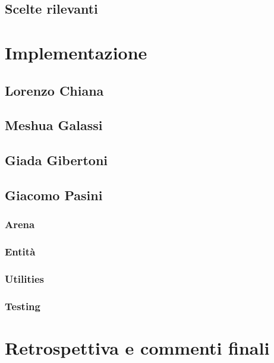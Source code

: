         \section{Scelte rilevanti}\label{sec:choices}
            
           
    \clearpage

    \chapter{Implementazione}\label{ch:implementation}
        
        \section{Lorenzo Chiana}\label{sec:chiana}
            
    
        
        \section{Meshua Galassi}\label{sec:galassi}
            

        \clearpage
    
        \section{Giada Gibertoni}\label{sec:gibertoni}
            
        
        
        \section{Giacomo Pasini}\label{sec:pasini}
            
            \subsection{Arena}\label{subsec:pasini:arena}
                
            \subsection{Entità}\label{subsec:pasini:entità}
                
            \subsection{Utilities}\label{subsec:pasini:utilities}
                
            \subsection{Testing}\label{subsec:pasini:testing}
                

    \clearpage

    \chapter{Retrospettiva e commenti finali}\label{ch:retrospective}
        
        

